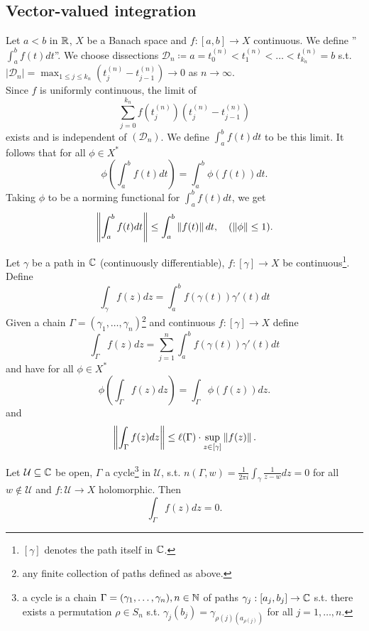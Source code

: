 \documentclass{article}
\begin{document}
\subsection{Vector-valued integration}
Let $a<b$ in $\mathbb{R}$, $X$ be a Banach space and $f:[a,b]\to X$ continuous. We define ''$\displaystyle \int^b_a f(t) dt$''. We choose dissections $\mathcal{D}_n\coloneqq a = t^{(n)}_0<t^{(n)}_1<\dots <t^{(n)}_{k_n} = b$ s.t. $|\mathcal{D}_n| = \displaystyle\max_{1\leq j \leq k_n}(t^{(n)}_j-t^{(n)}_{j-1})\to 0$ as $n\to \infty$.\\

Since $f$ is uniformly continuous, the limit of
$$
\displaystyle\sum^{k_n}_{j=0}f(t^{(n)}_j)(t^{(n)}_j-t^{(n)}_{j-1})
$$
exists and is independent of $(\mathcal{D}_n)$. We define $\displaystyle \int^b_a f(t) dt$ to be this limit. It follows that for all $\phi\in X^*$
$$
\phi\left(\displaystyle \int^b_a f(t) dt\right) = \displaystyle \int^b_a \phi(f(t)) dt.
$$
Taking $\phi$ to be a norming functional for $\displaystyle \int^b_a f(t) dt$, we get
$$
\left\lVert\displaystyle \int^b_a f(t) dt\right\rVert\leq \displaystyle \int^b_a \left\lVert f(t)\right\rVert dt,\quad (\left\lVert\phi\right\rVert\leq 1).
$$

Let $\gamma$ be a path in $\mathbb{C}$ (continuously differentiable), $f:[\gamma]\to X$ be continuous\footnote{$[\gamma]$ denotes the path itself in $\mathbb{C}$.}. Define
$$
\displaystyle \int_\gamma f(z) dz = \displaystyle \int^b_a f(\gamma(t))\gamma'(t) dt
$$
Given a chain $\Gamma = (\gamma_1, \dots, \gamma_n)$\footnote{any finite collection of paths defined as above.} and continuous $f:[\gamma]\to X$ define 
$$
\displaystyle \int_\Gamma f(z) dz = \displaystyle \sum^n_{j=1}\int^b_a f(\gamma(t))\gamma'(t) dt
$$
and have for all $\phi\in X^*$
$$
\phi\left(\int_\Gamma f(z) dz\right) = \displaystyle \int_\Gamma \phi(f(z)) dz.
$$
and 
$$
\left\lVert\int_\Gamma f(z) dz\right\rVert\leq \ell(\Gamma)\cdot\displaystyle\sup_{z\in[\gamma]}\left\lVert f(z)\right\rVert.
$$

\begin{theorem}\label{thm: Cauchy Banach space version}
    Let $\mathcal{U}\subseteq\mathbb{C}$ be open, $\Gamma$ a cycle\footnote{a cycle is a chain $\Gamma = (\gamma_1, \dots, \gamma_n), n\in \mathbb{N}$ of paths $\gamma_j:[a_j, b_j]\to \mathbb{C}$ s.t. there exists a permutation $\rho\in S_n$ s.t. $\gamma_j(b_j) = \gamma_{\rho(j)(a_{\rho(j)})}$ for all $j=1, \dots, n$.} in $\mathcal{U}$,  s.t. $n(\Gamma, w) = \frac{1}{2\pi i}\displaystyle\int_{\gamma}\frac{1}{z-w}dz=0$ for all $w\not\in\mathcal{U}$ and $f:\mathcal{U}\to X$ holomorphic. Then 
$$
\displaystyle \int_\Gamma f(z) dz = 0.
$$
\end{theorem}
\end{document}
